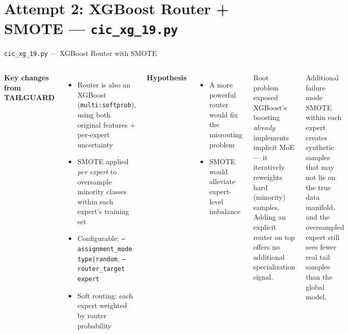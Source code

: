 \documentclass[aspectratio=169,10pt]{beamer}
\begin{document}
\section{Attempt 2: XGBoost Router + SMOTE --- \texttt{cic\_xg\_19.py}}

\begin{frame}{\texttt{cic\_xg\_19.py} --- XGBoost Router with SMOTE}
  \begin{columns}[T]
      \textbf{Key changes from TAILGUARD}
      \begin{itemize}
        \item Router is also an XGBoost (\texttt{multi:softprob}),
              using both original features + per-expert uncertainty
        \item SMOTE applied \emph{per expert} to oversample minority
              classes within each expert's training set
        \item Configurable: \texttt{--assignment\_mode type|random},
              \texttt{--router\_target expert}
        \item Soft routing: each expert weighted by router probability
      \end{itemize}
      \vspace{6pt}
      \textbf{Hypothesis}
      \begin{itemize}
        \item A more powerful router would fix the misrouting problem
        \item SMOTE would alleviate expert-level imbalance
      \end{itemize}
      \begin{alertblock}{Root problem exposed}
        XGBoost's boosting \emph{already} implements implicit MoE ---
        it iteratively reweights hard (minority) samples.
        Adding an explicit router on top offers no additional
        specialization signal.
      \end{alertblock}
      \vspace{6pt}
      \begin{block}{Additional failure mode}
        SMOTE within each expert creates synthetic samples that
        may not lie on the true data manifold, and the oversampled
        expert still sees fewer real tail samples than the global model.
      \end{block}
  \end{columns}
\end{frame}
\end{document}
